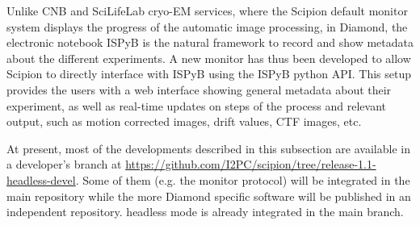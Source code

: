 Unlike CNB and SciLifeLab cryo-EM services, where the
Scipion default monitor system displays the progress of the automatic image
processing, in Diamond, the electronic notebook ISPyB is the natural framework
to record and show metadata about the different experiments. A new monitor has thus been developed to allow Scipion to directly interface with ISPyB using the ISPyB python API.
This setup provides the users with a web interface showing general metadata about their experiment, as well as  real-time updates on steps of the process and relevant output, such as motion corrected images, drift values, CTF images, etc.

At present, most of the developments described in this subsection are available in a developer's branch  at \url{https://github.com/I2PC/scipion/tree/release-1.1-headless-devel}. Some of them (e.g. the monitor protocol) will be integrated in the main \scipion repository while the more Diamond specific software will be published in an independent repository. \scipion headless mode is already integrated in the main \scipion branch.
